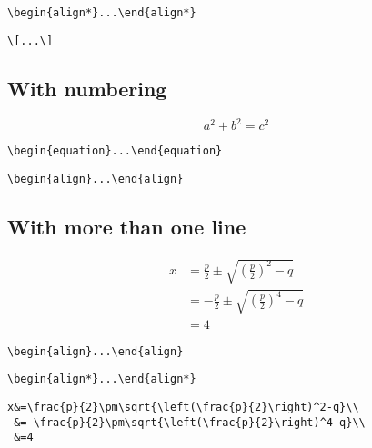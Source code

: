\documentclass{article}
\begin{document}
\begin{lstlisting}[frame=single]
\begin{align*}...\end{align*}
\end{lstlisting}

\begin{lstlisting}[frame=single]
\[...\]
\end{lstlisting}

\subsection{With numbering}

\begin{equation}
a^2+b^2=c^2
\end{equation}

\begin{lstlisting}[frame=single]
\begin{equation}...\end{equation}
\end{lstlisting}

\begin{lstlisting}[frame=single]
\begin{align}...\end{align}
\end{lstlisting}

\subsection{With more than one line}

\begin{align*}
	x &= \frac{p}{2} \pm \sqrt{\left( \frac{p}{2} \right)^2 - q}\\
	  &= - \frac{p}{2} \pm \sqrt{\left( \frac{p}{2} \right)^4 - q}\\
	  &= 4 
\end{align*}

\begin{lstlisting}[frame=single]
\begin{align}...\end{align}
\end{lstlisting}

\begin{lstlisting}[frame=single]
\begin{align*}...\end{align*}
\end{lstlisting}

\begin{lstlisting}[frame=single]
x&=\frac{p}{2}\pm\sqrt{\left(\frac{p}{2}\right)^2-q}\\
 &=-\frac{p}{2}\pm\sqrt{\left(\frac{p}{2}\right)^4-q}\\
 &=4 
\end{lstlisting}
\end{document}
